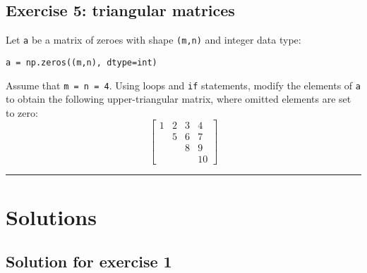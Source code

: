 \documentclass[10pt]{scrartcl}
\begin{document}
    \hypertarget{exercise-5-triangular-matrices}{%
\subsection{Exercise 5: triangular
matrices}\label{exercise-5-triangular-matrices}}

Let \texttt{a} be a matrix of zeroes with shape \texttt{(m,n)} and
integer data type:

\begin{verbatim}
a = np.zeros((m,n), dtype=int)
\end{verbatim}

Assume that \texttt{m\ =\ n\ =\ 4}. Using loops and \texttt{if}
statements, modify the elements of \texttt{a} to obtain the following
upper-triangular matrix, where omitted elements are set to zero: \[
\begin{bmatrix}
1 & 2 & 3 & 4  \\
 & 5 & 6 & 7  \\
  & & 8 & 9 \\
  & & & 10 
\end{bmatrix}
\]

    \begin{center}\rule{0.5\linewidth}{0.5pt}\end{center}

\hypertarget{solutions}{%
\section{Solutions}\label{solutions}}

    \hypertarget{solution-for-exercise-1}{%
\subsection{Solution for exercise 1}\label{solution-for-exercise-1}}
\end{document}
